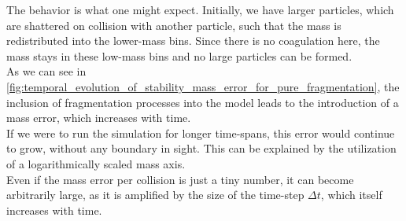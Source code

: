         The behavior is what one might expect. Initially, we have larger particles, which 
        are shattered on collision with another particle, such that the mass is 
        redistributed into the lower-mass bins. Since there is no coagulation here, the mass stays 
        in these low-mass bins and no large particles can be formed. \\

        As we can see in
        \cref{fig:temporal_evolution_of_stability_mass_error_for_pure_fragmentation},
        the inclusion of fragmentation processes into the model leads to the 
        introduction of a mass error, which increases with time. \\

        If we were to run the simulation for longer time-spans, this error would 
        continue to grow, without any boundary in sight. This can be explained by 
        the utilization of a logarithmically scaled mass axis. \\

        Even if the mass error per collision is just a tiny number, it can become 
        arbitrarily large, as it is amplified by the size of the time-step $\Delta t$,
        which itself increases with time.

